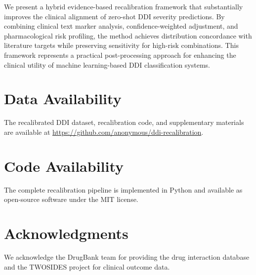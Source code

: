 \documentclass[11pt,a4paper]{article}
\begin{document}
We present a hybrid evidence-based recalibration framework that substantially improves the clinical alignment of zero-shot DDI severity predictions. By combining clinical text marker analysis, confidence-weighted adjustment, and pharmacological risk profiling, the method achieves distribution concordance with literature targets while preserving sensitivity for high-risk combinations. This framework represents a practical post-processing approach for enhancing the clinical utility of machine learning-based DDI classification systems.

\section*{Data Availability}

The recalibrated DDI dataset, recalibration code, and supplementary materials are available at \url{https://github.com/anonymous/ddi-recalibration}.

\section*{Code Availability}

The complete recalibration pipeline is implemented in Python and available as open-source software under the MIT license.

\section*{Acknowledgments}

We acknowledge the DrugBank team for providing the drug interaction database and the TWOSIDES project for clinical outcome data.
\end{document}
